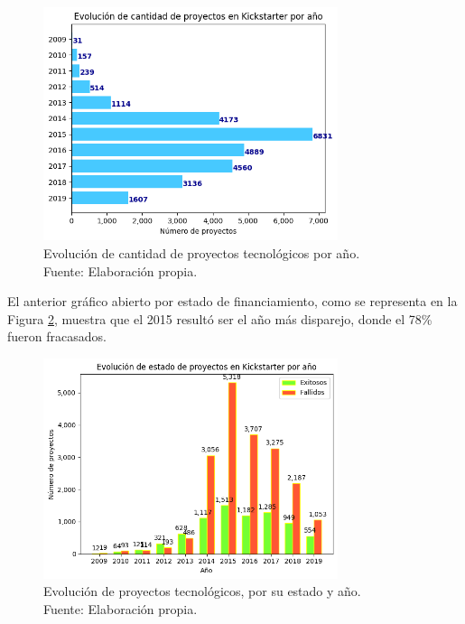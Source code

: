 \begin{figure}[!ht]
	\begin{center}
		\includegraphics[width=0.77\textwidth]{4/figures/projects state by year.png}
		\caption[Evolución de cantidad de proyectos tecnológicos por año]{Evolución de cantidad de proyectos tecnológicos por año.\\
			Fuente: Elaboración propia.}
		\label{4:fig13}
	\end{center}
\end{figure}

El anterior gráfico abierto por estado de financiamiento, como se representa en la Figura \ref{4:fig14}, muestra que el 2015 resultó ser el año más disparejo, donde el 78\% fueron fracasados.

\begin{figure}[!ht]
	\begin{center}
		\includegraphics[width=0.77\textwidth]{4/figures/projects state evolution by year.png}
		\caption[Evolución de proyectos tecnológicos, por su estado y año]{Evolución de proyectos tecnológicos, por su estado y año.\\
			Fuente: Elaboración propia.}
		\label{4:fig14}
	\end{center}
\end{figure}


